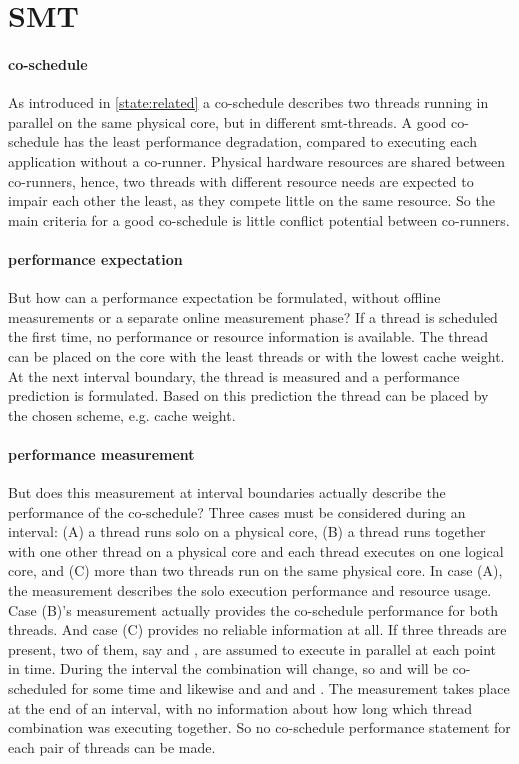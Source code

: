 \section{SMT}
\label{design:smt}

\paragraph{co-schedule}
As introduced in \ref{state:related} a co-schedule describes two threads running
in parallel on the same physical core, but in different \gls{smt}-threads.
A good co-schedule has the least performance degradation,
compared to executing each application without a co-runner.
Physical hardware resources are shared between co-runners, hence, two threads with
different resource needs are expected to impair each other the least, as they
compete little on the same resource.
So the main criteria for a good co-schedule is little conflict potential
between co-runners.

\paragraph{performance expectation}
But how can a performance expectation be formulated, without offline
measurements or a separate online measurement phase?
If a thread is scheduled the first time, no performance or resource information
is available.
The thread can be placed on the core with the least threads or with the lowest
cache weight. 
At the next interval boundary, the thread is measured and a performance
prediction is formulated.
Based on this prediction the thread can be placed by the chosen scheme,
e.g. cache weight.

\paragraph{performance measurement}
But does this measurement at interval boundaries actually describe the
performance of the co-schedule?
Three cases must be considered during an interval:
(A) a thread runs solo on a physical core,
(B) a thread runs together with one other thread on a physical core and each
thread executes on one logical core, and
(C) more than two threads run on the same physical core.
In case (A), the measurement describes the solo execution performance and
resource usage.
Case (B)'s measurement actually provides the co-schedule performance for both
threads.
And case (C) provides no reliable information at all.
If three threads are present, two of them, say \alpha{} and \beta{}, are assumed to
execute in parallel at each point in time.
During the interval the combination will change, so \alpha{} and \gamma{} will be
co-scheduled for some time and likewise \beta{} and \gamma{} and \alpha{} and
\beta{}.
The measurement takes place at the end of an interval, with no information
about how long which thread combination was executing together. So no
co-schedule performance statement for each pair of threads can be made.

